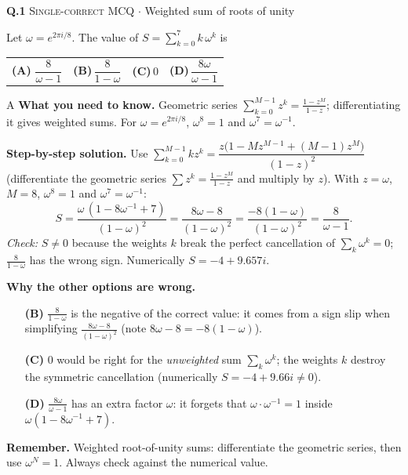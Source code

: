 \documentclass[11pt,a4paper]{article}
\newcommand{\optlabel}[1]{\textbf{(#1)}}
\newcommand{\correctlabel}[1]{\textcolor{okgreen}{\textbf{(#1)}\,\ding{51}}}
\newenvironment{qitem}[1]{\begin{list}{}{\setlength{\leftmargin}{3.3em}\setlength{\labelwidth}{3.1em}%
  \setlength{\labelsep}{0.2em}\setlength{\topsep}{3pt}\setlength{\parsep}{3pt}}\item[\textbf{Q.#1}\hfill]}{\end{list}}
\newcommand{\qsep}{\par\vspace{2pt}{\color{black!15}\hrule}\vspace{4pt}}
\newcommand{\qmeta}[2]{{\footnotesize\color{black!60}\textsc{#1} \;$\cdot$\; #2}\par}
\begin{document}
\begin{qitem}{1}
\qmeta{Single-correct MCQ}{Weighted sum of roots of unity}
Let $\omega = e^{2\pi i/8}$. The value of $\displaystyle S = \sum_{k=0}^{7} k\,\omega^{k}$ is
\par\smallskip\noindent\begin{tabularx}{\linewidth}{@{}*{4}{L}@{}}
\correctlabel{A}\,$\dfrac{8}{\omega - 1}$ & \optlabel{B}\,$\dfrac{8}{1-\omega}$ & \optlabel{C}\,$0$ & \optlabel{D}\,$\dfrac{8\omega}{\omega-1}$
\end{tabularx}
\end{qitem}
\begin{solbox}{A}
\textbf{\color{brand}What you need to know.} Geometric series $\sum_{k=0}^{M-1}z^k = \frac{1-z^M}{1-z}$; differentiating it gives weighted sums. For $\omega = e^{2\pi i/8}$, $\omega^8 = 1$ and $\omega^7 = \omega^{-1}$.

\textbf{\color{brand}Step-by-step solution.} Use $\sum_{k=0}^{M-1} k z^k = \dfrac{z\big(1 - M z^{M-1} + (M-1) z^{M}\big)}{(1-z)^2}$ (differentiate the geometric
series $\sum z^k = \frac{1-z^M}{1-z}$ and multiply by $z$). With $z = \omega$, $M = 8$, $\omega^8 = 1$ and $\omega^7 = \omega^{-1}$:
\[ S = \frac{\omega\,(1 - 8\omega^{-1} + 7)}{(1-\omega)^2} = \frac{8\omega - 8}{(1-\omega)^2} = \frac{-8(1-\omega)}{(1-\omega)^2}
     = \frac{8}{\omega - 1}. \]
\emph{Check:} $S \neq 0$ because the weights $k$ break the perfect cancellation of $\sum_k \omega^k = 0$;
$\frac{8}{1-\omega}$ has the wrong sign. Numerically $S = -4 + 9.657i$.

\textbf{\color{brand}Why the other options are wrong.}
\begin{itemize}[leftmargin=2.4em, itemsep=1pt, topsep=2pt]
\item[\textbf{(B)}] $\frac{8}{1-\omega}$ is the negative of the correct value: it comes from a sign slip when simplifying $\frac{8\omega - 8}{(1-\omega)^2}$ (note $8\omega - 8 = -8(1-\omega)$).
\item[\textbf{(C)}] $0$ would be right for the \emph{unweighted} sum $\sum_k\omega^k$; the weights $k$ destroy the symmetric cancellation (numerically $S = -4 + 9.66i \neq 0$).
\item[\textbf{(D)}] $\frac{8\omega}{\omega - 1}$ has an extra factor $\omega$: it forgets that $\omega\cdot\omega^{-1} = 1$ inside $\omega(1 - 8\omega^{-1} + 7)$.
\end{itemize}
\textbf{\color{brand}Remember.} Weighted root-of-unity sums: differentiate the geometric series, then use $\omega^N = 1$. Always check against the numerical value.
\end{solbox}
\qsep
\end{document}
